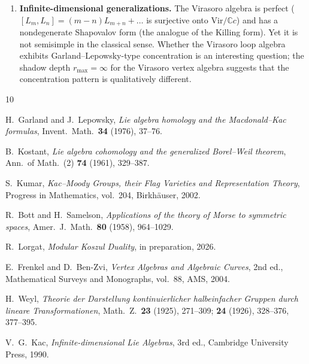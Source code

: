 \documentclass[11pt,reqno]{amsart}
\theoremstyle{plain}
\theoremstyle{definition}
\theoremstyle{remark}
\newcommand{\CC}{\mathbb{C}}
\begin{document}
\begin{enumerate}[label=(\arabic*),leftmargin=*]
 \item \textbf{Infinite-dimensional generalizations.}
 The Virasoro algebra is perfect ($[L_m, L_n] = (m-n)L_{m+n} + \ldots$
 is surjective onto $\text{Vir}/\CC c$) and has a nondegenerate Shapovalov
 form (the analogue of the Killing form). Yet it is not semisimple in the
 classical sense. Whether the Virasoro loop algebra exhibits
 Garland--Lepowsky-type concentration is an interesting question; the
 shadow depth $r_{\max} = \infty$ for the Virasoro vertex algebra
 suggests that the concentration pattern is qualitatively different.

\end{enumerate}


\begin{thebibliography}{10}

H.~Garland and J.~Lepowsky,
\emph{Lie algebra homology and the Macdonald--Kac formulas},
Invent.\ Math.\ \textbf{34} (1976), 37--76.

B.~Kostant,
\emph{Lie algebra cohomology and the generalized Borel--Weil theorem},
Ann.\ of Math.\ (2) \textbf{74} (1961), 329--387.

S.~Kumar,
\emph{Kac--Moody Groups, their Flag Varieties and Representation Theory},
Progress in Mathematics, vol.\ 204, Birkh\"auser, 2002.

R.~Bott and H.~Samelson,
\emph{Applications of the theory of Morse to symmetric spaces},
Amer.\ J.\ Math.\ \textbf{80} (1958), 964--1029.

R.~Lorgat,
\emph{Modular Koszul Duality},
in preparation, 2026.

E.~Frenkel and D.~Ben-Zvi,
\emph{Vertex Algebras and Algebraic Curves}, 2nd ed.,
Mathematical Surveys and Monographs, vol.\ 88, AMS, 2004.

H.~Weyl,
\emph{Theorie der Darstellung kontinuierlicher halbeinfacher Gruppen durch
lineare Transformationen},
Math.\ Z.\ \textbf{23} (1925), 271--309; \textbf{24} (1926), 328--376,
377--395.

V.~G.~Kac,
\emph{Infinite-dimensional Lie Algebras}, 3rd ed.,
Cambridge University Press, 1990.

\end{thebibliography}
\end{document}
